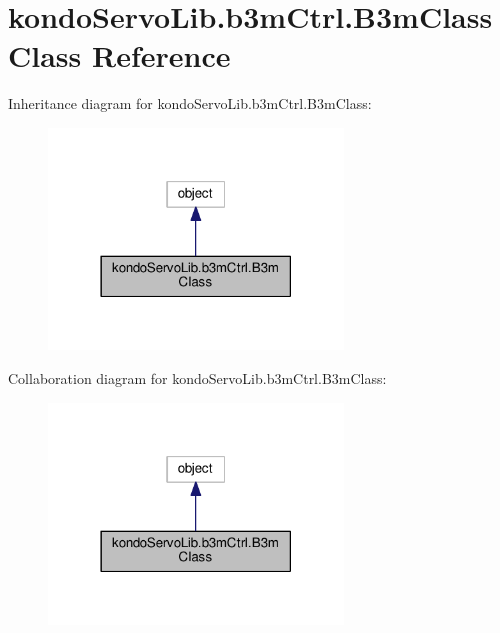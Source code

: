 \hypertarget{classkondoServoLib_1_1b3mCtrl_1_1B3mClass}{}\section{kondo\+Servo\+Lib.\+b3m\+Ctrl.\+B3m\+Class Class Reference}
\label{classkondoServoLib_1_1b3mCtrl_1_1B3mClass}


Inheritance diagram for kondo\+Servo\+Lib.\+b3m\+Ctrl.\+B3m\+Class\+:\nopagebreak
\begin{figure}[H]
\begin{center}
\leavevmode
\includegraphics[width=222pt]{classkondoServoLib_1_1b3mCtrl_1_1B3mClass__inherit__graph}
\end{center}
\end{figure}


Collaboration diagram for kondo\+Servo\+Lib.\+b3m\+Ctrl.\+B3m\+Class\+:\nopagebreak
\begin{figure}[H]
\begin{center}
\leavevmode
\includegraphics[width=222pt]{classkondoServoLib_1_1b3mCtrl_1_1B3mClass__coll__graph}
\end{center}
\end{figure}
